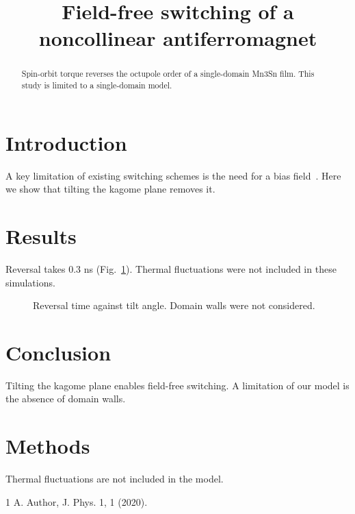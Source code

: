\documentclass{article}
\begin{document}
\title{Field-free switching of a noncollinear antiferromagnet}
\begin{abstract}
Spin-orbit torque reverses the octupole order of a single-domain Mn3Sn film.
This study is limited to a single-domain model.
\end{abstract}

\section{Introduction}
A key limitation of existing switching schemes is the need for a bias field~\cite{a}.
Here we show that tilting the kagome plane removes it.

\section{Results}
Reversal takes 0.3 ns (Fig.~\ref{fig:1}).
Thermal fluctuations were not included in these simulations.

\begin{figure}
\caption{Reversal time against tilt angle. Domain walls were not considered.}
\label{fig:1}
\end{figure}

\section{Conclusion}
Tilting the kagome plane enables field-free switching. A limitation of our model is the absence of domain walls.

\section*{Methods}
Thermal fluctuations are not included in the model.

\begin{thebibliography}{1}
 A. Author, J. Phys. 1, 1 (2020).
\end{thebibliography}
\end{document}
